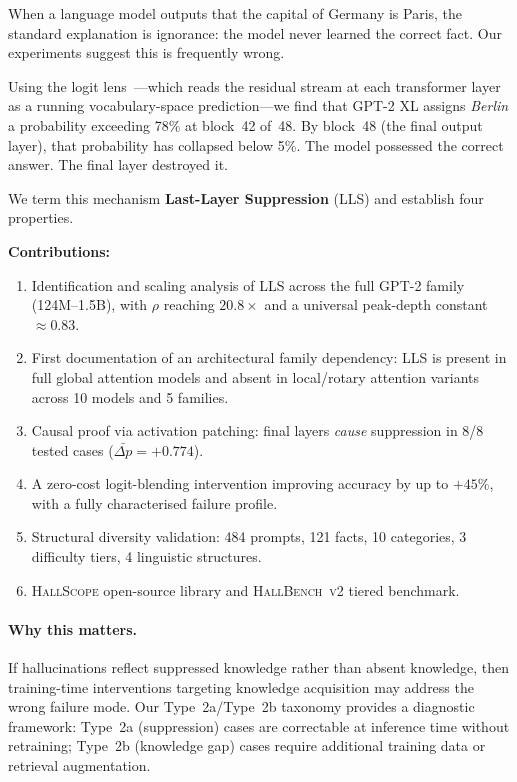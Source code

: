 \documentclass{article}
\begin{document}
When a language model outputs that the capital of Germany is Paris, the
standard explanation is ignorance: the model never learned the correct fact.
Our experiments suggest this is frequently wrong.

Using the logit lens~\citep{nostalgebraist2020logitlens}---which reads the
residual stream at each transformer layer as a running vocabulary-space
prediction---we find that GPT-2 XL assigns \emph{Berlin} a probability
exceeding 78\% at block~42 of~48.
By block~48 (the final output layer), that probability has collapsed below 5\%.
The model possessed the correct answer. The final layer destroyed it.

We term this mechanism \textbf{Last-Layer Suppression} (LLS) and establish
four properties.

\begin{mdframed}[backgroundcolor=findingblue,linewidth=0pt,
  innertopmargin=6pt,innerbottommargin=6pt,innerleftmargin=8pt,
  innerrightmargin=8pt]
\textbf{Contributions:}
\begin{enumerate}[leftmargin=1.5em,topsep=2pt,itemsep=1pt,
                  label={\arabic*.}]
  \item Identification and scaling analysis of LLS across the full GPT-2
        family (124M--1.5B), with $\rho$ reaching $20.8\times$ and a universal
        peak-depth constant $\approx 0.83$.
  \item First documentation of an architectural family dependency: LLS is
        present in full global attention models and absent in local/rotary
        attention variants across 10 models and 5 families.
  \item Causal proof via activation patching: final layers \emph{cause}
        suppression in 8/8 tested cases ($\bar{\Delta p} = +0.774$).
  \item A zero-cost logit-blending intervention improving accuracy by up to
        $+45\%$, with a fully characterised failure profile.
  \item Structural diversity validation: 484 prompts, 121 facts, 10
        categories, 3 difficulty tiers, 4 linguistic structures.
  \item \textsc{HallScope} open-source library and \textsc{HallBench~v2}
        tiered benchmark.
\end{enumerate}
\end{mdframed}

\paragraph{Why this matters.}
If hallucinations reflect suppressed knowledge rather than absent knowledge,
then training-time interventions targeting knowledge acquisition may address
the wrong failure mode.
Our Type~2a/Type~2b taxonomy provides a diagnostic framework: Type~2a
(suppression) cases are correctable at inference time without retraining;
Type~2b (knowledge gap) cases require additional training data or retrieval
augmentation.
\end{document}

